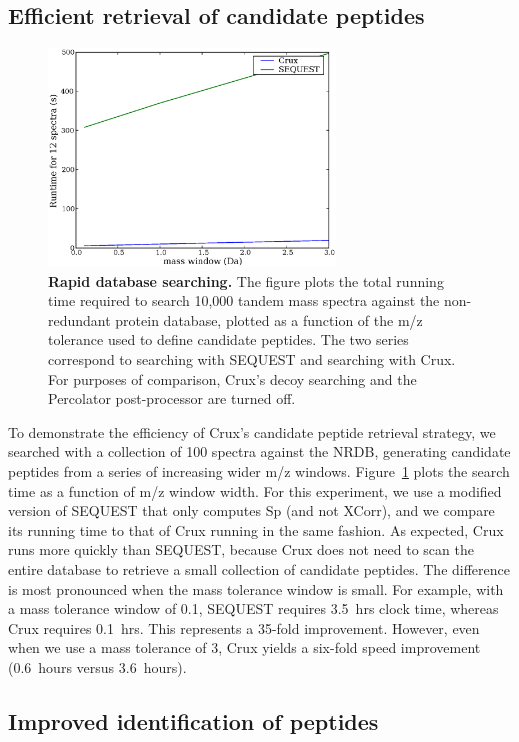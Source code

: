 \documentclass{bioinfo}
\begin{document}
\subsection{Efficient retrieval of candidate peptides}

\begin{figure}
  \centering
  \includegraphics[width=3in]{./Images/indexing.eps}
  \caption{{\bf Rapid database searching.}  The figure plots the total
  running time required to search 10,000 tandem mass spectra against
  the non-redundant protein database, plotted as a function of the m/z
  tolerance used to define candidate peptides.  The two series
  correspond to searching with SEQUEST and searching with Crux.  For
  purposes of comparison, Crux's decoy searching and the Percolator
  post-processor are turned off.
  \label{figure:indexing}}
\end{figure}

To demonstrate the efficiency of Crux's candidate peptide retrieval
strategy, we searched with a collection of 100 spectra against the
NRDB, generating candidate peptides from a series of increasing wider
m/z windows.  Figure~\ref{figure:indexing} plots the search time as a
function of m/z window width.  For this experiment, we use a modified
version of SEQUEST that only computes Sp (and not XCorr), and we
compare its running time to that of Crux running in the same fashion.
As expected, Crux runs more quickly than SEQUEST, because Crux does
not need to scan the entire database to retrieve a small collection of
candidate peptides.  The difference is most pronounced when the mass
tolerance window is small.  For example, with a mass tolerance window
of 0.1, SEQUEST requires 3.5~hrs clock time, whereas Crux requires
0.1~hrs.  This represents a 35-fold improvement.  However, even when
we use a mass tolerance of 3, Crux yields a six-fold speed improvement
(0.6~hours versus 3.6~hours).

\subsection{Improved identification of peptides}
\end{document}
